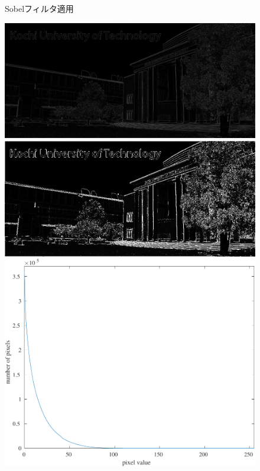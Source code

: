 \begin{figure}[H]
\begin{minipage}[b]{.3\textwidth}
    \end{minipage}
    \caption{Sobelフィルタ適用}
\end{figure}
\begin{figure}[H]
    \centering
    \begin{minipage}[b]{.3\textwidth}
        \centering
        \includegraphics[keepaspectratio,width=\textwidth]{../../Figures/06_41_lf-img}
    \end{minipage}
    \begin{minipage}[b]{.3\textwidth}
        \centering
        \includegraphics[keepaspectratio,width=\textwidth]{../../Figures/06_43_lf-img-thresholding.png}
    \end{minipage}
    \begin{minipage}[b]{.3\textwidth}
        \centering
        \includegraphics[keepaspectratio,width=\textwidth]{../../Figures/06_42_Thresholding-graph.pdf}

\end{minipage}
\end{figure}
